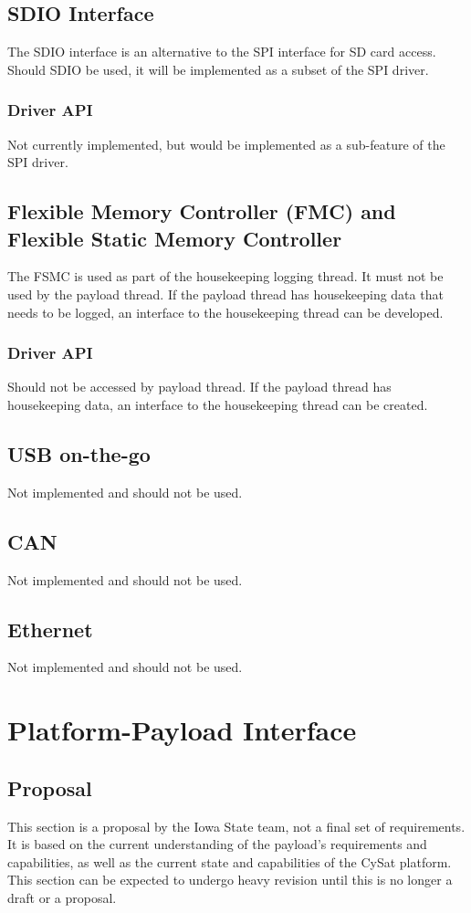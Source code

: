 \documentclass[10pt]{extarticle}
\begin{document}
\subsection{SDIO Interface}
The SDIO interface is an alternative to the SPI interface for SD card access.
Should SDIO be used, it will be implemented as a subset of the SPI driver.
\subsubsection{Driver API}
Not currently implemented, but would be implemented as a sub-feature of the 
SPI driver.

\subsection{Flexible Memory Controller (FMC) and Flexible Static Memory Controller}
The FSMC is used as part of the housekeeping logging thread. It must 
not be used by 
the payload thread. If the payload thread has housekeeping data that needs to
be logged,
an interface to the housekeeping thread can be developed.
\subsubsection{Driver API}
Should not be accessed by payload thread. If the payload thread has housekeeping data,
an interface to the housekeeping thread can be created.

\subsection{USB on-the-go}
Not implemented and should not be used.

\subsection{CAN}
Not implemented and should not be used.

\subsection{Ethernet}
Not implemented and should not be used.

\section{Platform-Payload Interface}
\subsection{Proposal}
This section is a proposal by the Iowa State team, not
a final set of requirements. It is based on the current understanding of the
payload's requirements and capabilities, as well as the current state and 
capabilities of the CySat platform. This section can be expected
to undergo heavy revision until this is no longer a draft or
a proposal.
\end{document}
